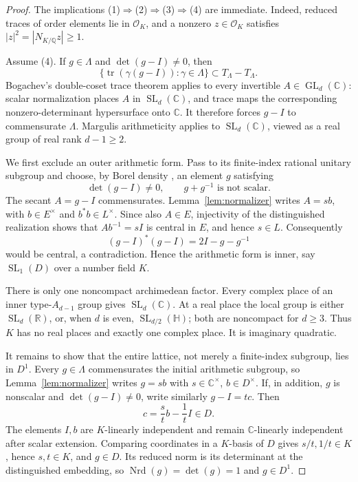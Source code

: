 \documentclass[11pt,reqno]{amsart}
\theoremstyle{definition}
\theoremstyle{remark}
\newcommand{\R}{\mathbb R}
\newcommand{\C}{\mathbb C}
\newcommand{\Q}{\mathbb Q}
\newcommand{\cO}{\mathcal O}
\newcommand{\Tr}{\operatorname{tr}}
\newcommand{\Nrd}{\operatorname{Nrd}}
\newcommand{\SL}{\operatorname{SL}}
\newcommand{\GL}{\operatorname{GL}}
\begin{document}
\begin{proof}
The implications (1)\(\Rightarrow\)(2)\(\Rightarrow\)(3)\(\Rightarrow\)(4)
are immediate.  Indeed, reduced traces of order elements lie in \(\cO_K\),
and a nonzero \(z\in\cO_K\) satisfies
\(|z|^2=|N_{K/\Q}z|\ge1\).

Assume (4).  If \(g\in\Lambda\) and \(\det(g-I)\ne0\), then
\[
 \{\Tr(\gamma(g-I)):\gamma\in\Lambda\}
 \subset T_\Lambda-T_\Lambda.
\]
Bogachev's double-coset trace theorem applies to every invertible
\(A\in\GL_d(\C)\): scalar normalization places \(A\) in \(\SL_d(\C)\), and
trace maps the corresponding nonzero-determinant hypersurface onto \(\C\).
It therefore forces \(g-I\) to commensurate \(\Lambda\).  Margulis
arithmeticity \cite[Chapter~IX]{Margulis} applies to \(\SL_d(\C)\), viewed as a
real group of real rank \(d-1\ge2\).

We first exclude an outer arithmetic form.  Pass to its finite-index rational
unitary subgroup and choose, by Borel density \cite{BorelDensity}, an element \(g\) satisfying
\[
 \det(g-I)\ne0,
 \qquad g+g^{-1}\text{ is not scalar}.
\]
The secant \(A=g-I\) commensurates.  Lemma~\ref{lem:normalizer} writes
\(A=sb\), with \(b\in E^\times\) and \(b^*b\in L^\times\).  Since also
\(A\in E\), injectivity of the distinguished realization shows that
\(Ab^{-1}=sI\) is central in \(E\), and hence \(s\in L\).  Consequently
\[
 (g-I)^*(g-I)=2I-g-g^{-1}
\]
would be central, a contradiction.  Hence the arithmetic form is inner,
say \(\SL_1(D)\) over a number field \(K\).

There is only one noncompact archimedean factor.  Every complex place of an
inner type-\(A_{d-1}\) group gives \(\SL_d(\C)\).  At a real place the local
group is either \(\SL_d(\R)\), or, when \(d\) is even,
\(\SL_{d/2}(\mathbb H)\); both are noncompact for \(d\ge3\).  Thus \(K\) has
no real places and exactly one complex place.  It is imaginary quadratic.

It remains to show that the entire lattice, not merely a finite-index subgroup,
lies in \(D^1\).  Every \(g\in\Lambda\) commensurates the initial arithmetic
subgroup, so Lemma~\ref{lem:normalizer} writes
\(g=s b\) with \(s\in\C^\times\), \(b\in D^\times\).  If, in addition,
\(g\) is nonscalar and \(\det(g-I)\ne0\), write similarly
\(g-I=t c\).  Then
\[
 c=\frac{s}{t}b-\frac1t I\in D.
\]
The elements \(I,b\) are \(K\)-linearly independent and remain
\(\C\)-linearly independent after scalar extension.  Comparing coordinates in
a \(K\)-basis of \(D\) gives \(s/t,1/t\in K\), hence \(s,t\in K\), and
\(g\in D\).  Its reduced norm is its determinant at the distinguished
embedding, so \(\Nrd(g)=\det(g)=1\) and \(g\in D^1\).


\end{proof}
\end{document}
